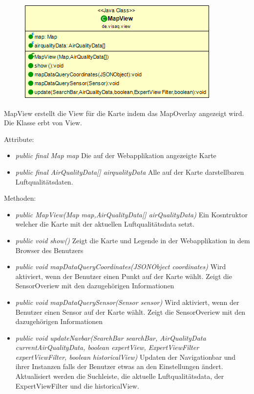 \begin{minipage}{0.4\textwidth}
    \begin{figure}[H]
        \includegraphics[scale = 0.5]{media/frontend/view/de.view/MapView_Class.png}
    \end{figure}
    \end{minipage} \hfill
    \begin{minipage}{0.4\textwidth}
MapView erstellt die View für die Karte indem das MapOverlay angezeigt wird. Die Klasse erbt von View.
\end{minipage}

Attribute:
\begin{itemize} 
    \item \emph{public final Map map} Die auf der Webapplikation angezeigte Karte
    \item \emph{public final AirQualityData[] airqualityData} Alle auf der Karte darstellbaren Luftqualitätsdaten. 
\end{itemize} 
Methoden:
\begin{itemize} 
    \item \emph{public MapView(Map map,AirQualityData[] airQualityData)} Ein Kosntruktor welcher die Karte mit der aktuellen Luftqualitätsdata setzt.
    \item \emph{public void show()} Zeigt die Karte und Legende in der Webapplikation in dem Browser des Benutzers
    \item \emph{public void mapDataQueryCoordinates(JSONObject coordinates)} Wird aktiviert, wenn der Benutzer einen Punkt auf der Karte wählt. Zeigt die SensorOveriew mit den dazugehörigen Informationen
    \item \emph{public void mapDataQuerySensor(Sensor sensor)} Wird aktiviert, wenn der Benutzer einen Sensor auf der Karte wählt. Zeigt die SensorOveriew mit den dazugehörigen Informationen
    \item \emph{public void updateNavbar(SearchBar searchBar, AirQualityData currentAirQualityData,
    boolean expertView, ExpertViewFilter expertViewFilter, boolean historicalView)} Updaten der Navigationbar und ihrer Instanzen falls der Benutzer etwas an den Einstellungen ändert. Aktualisiert werden die Suchleiste, die aktuelle Luftqualitätsdata, der ExpertViewFilter und die historicalView.
\end{itemize} 

